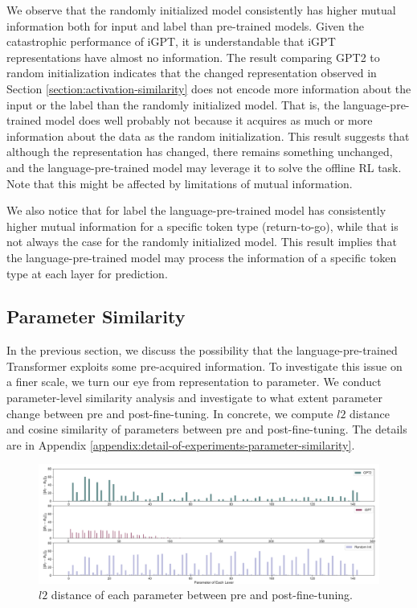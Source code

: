 We observe that the randomly initialized model consistently has higher mutual information both for input and label than pre-trained models. Given the catastrophic performance of iGPT, it is understandable that iGPT representations have almost no information. The result comparing GPT2 to random initialization indicates that the changed representation observed in Section \ref{section:activation-similarity} does not encode more information about the input or the label than the randomly initialized model. That is, the language-pre-trained model does well probably not because it acquires as much or more information about the data as the random initialization.
This result suggests that although the representation has changed, there remains something unchanged, and the language-pre-trained model may leverage it to solve the offline RL task. Note that this might be affected by limitations of mutual information.

We also notice that for label the language-pre-trained model has consistently higher mutual information for a specific token type (return-to-go), while that is not always the case for the randomly initialized model. This result implies that the language-pre-trained model may process the information of a specific token type at each layer for prediction. 

\subsection{Parameter Similarity}
\label{section:parameter-similarity}
In the previous section, we discuss the possibility that the language-pre-trained Transformer exploits some pre-acquired information. To investigate this issue on a finer scale, we turn our eye from representation to parameter. We conduct parameter-level similarity analysis and investigate to what extent parameter change between pre and post-fine-tuning. In concrete, we compute $l2$ distance and cosine similarity of parameters between pre and post-fine-tuning. The details are in Appendix \ref{appendix:detail-of-experiments-parameter-similarity}.

\begin{figure}[ht]
    \centering
        \includegraphics[width=\linewidth]{figs/paramdist_0_40_gpt2_igpt_dt_hopper_medium_666.pdf}
    \caption{$l2$ distance of each parameter between pre and post-fine-tuning.}
    \label{fig:param-dist}
\end{figure}

